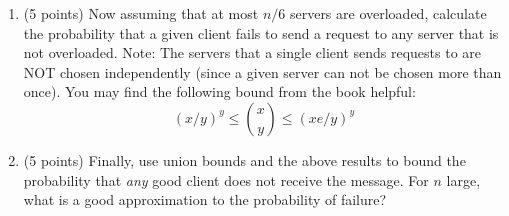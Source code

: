 \documentclass[11pt]{article}
\begin{document}
\begin{enumerate}
\begin{enumerate}
\pagebreak

\item (5 points) Now assuming that at most $n/6$ servers are overloaded, calculate the probability that a given client fails to send a request to any server that is not overloaded.  Note: The servers that a single client sends requests to are NOT chosen independently (since a given server can not be chosen more than once).  You may find the following bound from the book helpful: 
$$ (x/y)^{y} \leq {x \choose y} \leq (xe/y)^{y}$$


\pagebreak

\item (5 points) Finally, use union bounds and the above results to bound the probability that \emph{any} good client does not receive the message.  For $n$ large, what is a good approximation to the probability of failure?

\end{enumerate}
 
 
\end{enumerate}
\end{document}
